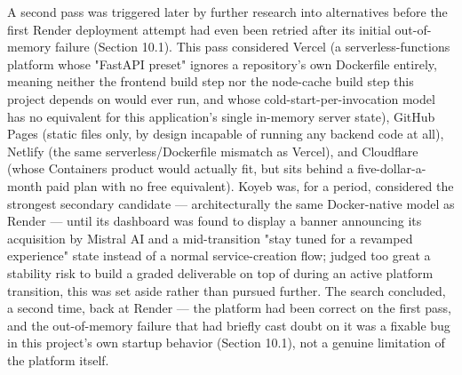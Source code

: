 A second pass was triggered later by further research into alternatives before the first Render deployment attempt had even been retried after its initial out-of-memory failure (Section 10.1). This pass considered Vercel (a serverless-functions platform whose "FastAPI preset" ignores a repository's own Dockerfile entirely, meaning neither the frontend build step nor the node-cache build step this project depends on would ever run, and whose cold-start-per-invocation model has no equivalent for this application's single in-memory server state), GitHub Pages (static files only, by design incapable of running any backend code at all), Netlify (the same serverless/Dockerfile mismatch as Vercel), and Cloudflare (whose Containers product would actually fit, but sits behind a five-dollar-a-month paid plan with no free equivalent). Koyeb was, for a period, considered the strongest secondary candidate — architecturally the same Docker-native model as Render — until its dashboard was found to display a banner announcing its acquisition by Mistral AI and a mid-transition "stay tuned for a revamped experience" state instead of a normal service-creation flow; judged too great a stability risk to build a graded deliverable on top of during an active platform transition, this was set aside rather than pursued further. The search concluded, a second time, back at Render — the platform had been correct on the first pass, and the out-of-memory failure that had briefly cast doubt on it was a fixable bug in this project's own startup behavior (Section 10.1), not a genuine limitation of the platform itself.

